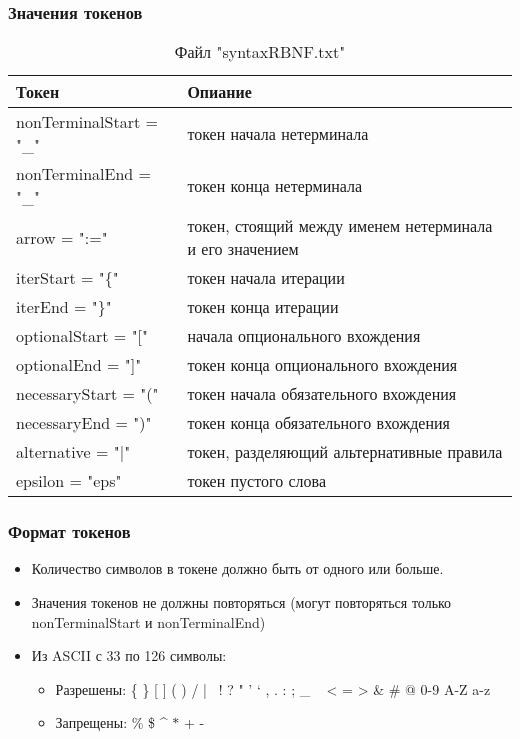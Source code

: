\documentclass[12pt]{article}
\begin{document}
    \subsubsection*{Значения токенов}
    \begin{table}[hbt!]
        \begin{tabular}{|l|l|}
            \hline
            Токен & Опиание \\
            \hline
            nonTerminalStart = "\_" & токен начала нетерминала \\
            nonTerminalEnd = "\_" & токен конца нетерминала \\
            arrow = ":=" & токен, стоящий между именем нетерминала и его значением \\
            iterStart = "\{" & токен начала итерации \\
            iterEnd = "\}" & токен конца итерации \\
            optionalStart = "[" & начала опционального вхождения \\
            optionalEnd = "]" & токен конца опционального вхождения \\
            necessaryStart = "(" & токен начала обязательного вхождения \\
            necessaryEnd = ")" & токен конца обязательного вхождения \\
            alternative = "$|$" & токен, разделяющий альтернативные правила \\
            epsilon = "eps" & токен пустого слова \\
            \hline
        \end{tabular}
        \caption{Файл "syntaxRBNF.txt"}
    \end{table}

    \subsubsection*{Формат токенов}
    \begin{itemize}
        \item Количество символов в токене должно быть от одного или больше.
        \item Значения токенов не должны повторяться (могут повторяться только nonTerminalStart и nonTerminalEnd)
        \item Из ASCII с 33 по 126 символы:
        \begin{itemize}
            \item Разрешены:   \{ \} [ ] ( ) / | \ ! ? " ' ` , . : ; \_ ~ < = > \& \# @ 0-9 A-Z a-z
            \item Запрещены:  \% \$ \^{} $\ast$ + -
        \end{itemize}
    \end{itemize}
\end{document}
